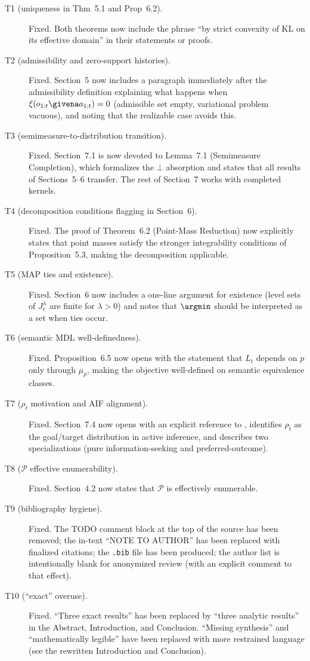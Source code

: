 \documentclass[11pt]{article}
\begin{document}
\begin{description}
\item[T1 (uniqueness in Thm~5.1 and Prop~6.2).] Fixed. Both theorems now include the phrase ``by strict convexity of KL on its effective domain'' in their statements or proofs.
\item[T2 (admissibility and zero-support histories).] Fixed. Section~5 now includes a paragraph immediately after the admissibility definition explaining what happens when $\xi(o_{1:t}\givena a_{1:t}) = 0$ (admissible set empty, variational problem vacuous), and noting that the realizable case avoids this.
\item[T3 (semimeasure-to-distribution transition).] Fixed. Section~7.1 is now devoted to Lemma~7.1 (Semimeasure Completion), which formalizes the $\bot$ absorption and states that all results of Sections~5--6 transfer. The rest of Section~7 works with completed kernels.
\item[T4 (decomposition conditions flagging in Section~6).] Fixed. The proof of Theorem~6.2 (Point-Mass Reduction) now explicitly states that point masses satisfy the stronger integrability conditions of Proposition~5.3, making the decomposition applicable.
\item[T5 (MAP ties and existence).] Fixed. Section~6 now includes a one-line argument for existence (level sets of $J_t^\lambda$ are finite for $\lambda > 0$) and notes that $\argmin$ should be interpreted as a set when ties occur.
\item[T6 (semantic MDL well-definedness).] Fixed. Proposition~6.5 now opens with the statement that $L_t$ depends on $p$ only through $\mu_p$, making the objective well-defined on semantic equivalence classes.
\item[T7 ($\rho_t$ motivation and AIF alignment).] Fixed. Section~7.4 now opens with an explicit reference to \citet{ParrFriston2019}, identifies $\rho_t$ as the goal/target distribution in active inference, and describes two specializations (pure information-seeking and preferred-outcome).
\item[T8 ($\mathcal{P}$ effective enumerability).] Fixed. Section~4.2 now states that $\mathcal{P}$ is effectively enumerable.
\item[T9 (bibliography hygiene).] Fixed. The TODO comment block at the top of the source has been removed; the in-text ``NOTE TO AUTHOR'' has been replaced with finalized citations; the \texttt{.bib} file has been produced; the author list is intentionally blank for anonymized review (with an explicit comment to that effect).
\item[T10 (``exact'' overuse).] Fixed. ``Three exact results'' has been replaced by ``three analytic results'' in the Abstract, Introduction, and Conclusion. ``Missing synthesis'' and ``mathematically legible'' have been replaced with more restrained language (see the rewritten Introduction and Conclusion).
\end{description}
\end{document}
